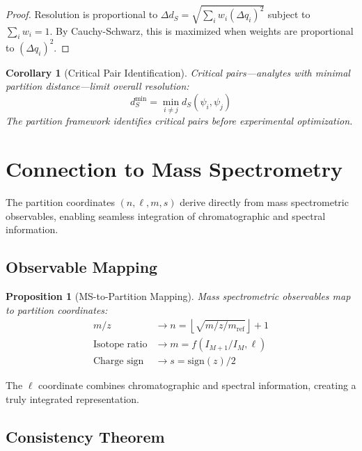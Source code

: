 \documentclass[twocolumn,10pt]{article}
\newtheorem{proposition}[theorem]{Proposition}
\newtheorem{corollary}[theorem]{Corollary}
\begin{document}
\begin{proof}
Resolution is proportional to $\Delta d_S = \sqrt{\sum_i w_i (\Delta q_i)^2}$ subject to $\sum_i w_i = 1$. By Cauchy-Schwarz, this is maximized when weights are proportional to $(\Delta q_i)^2$.
\end{proof}

\begin{corollary}[Critical Pair Identification]
\label{cor:critical}
Critical pairs---analytes with minimal partition distance---limit overall resolution:
\begin{equation}
d_S^{\min} = \min_{i \neq j} d_S(\psi_i, \psi_j)
\end{equation}
The partition framework identifies critical pairs before experimental optimization.
\end{corollary}

\section{Connection to Mass Spectrometry}
\label{sec:connection}

The partition coordinates $(n, \ell, m, s)$ derive directly from mass spectrometric observables, enabling seamless integration of chromatographic and spectral information.

\subsection{Observable Mapping}

\begin{proposition}[MS-to-Partition Mapping]
\label{prop:mapping}
Mass spectrometric observables map to partition coordinates:
\begin{align}
m/z &\to n = \left\lfloor \sqrt{m/z / m_{\text{ref}}} \right\rfloor + 1 \\
\text{Isotope ratio} &\to m = f(I_{M+1}/I_M, \ell) \\
\text{Charge sign} &\to s = \text{sign}(z)/2
\end{align}
\end{proposition}

The $\ell$ coordinate combines chromatographic and spectral information, creating a truly integrated representation.

\subsection{Consistency Theorem}
\end{document}
